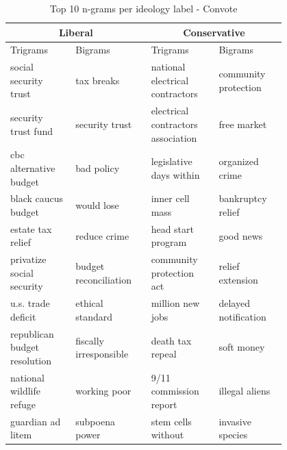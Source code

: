 \documentclass[10pt,a4paper,onecolumn]{article}
\begin{document}
\begin{table}[h!]
	\begin{center}
		\caption{Top 10 n-grams per ideology label - Convote}
		\label{tab:ngrams-convote}
		\begin{tabular}{p{0.2\linewidth}|p{0.2\linewidth}|p{0.2\linewidth}|p{0.2\linewidth}}
			\hline\hline
			\multicolumn{2}{c|}{\textbf{Liberal}} & \multicolumn{2}{c|}{\textbf{Conservative}} \\
			\hline
			Trigrams & Bigrams & Trigrams & Bigrams \\
			\hline
			social security trust & tax breaks & national electrical contractors & community protection \\
			security trust fund & security trust & electrical contractors association & free market \\
			cbc alternative budget & bad policy & legislative days within & organized crime \\
			black caucus budget & would lose & inner cell mass & bankruptcy relief \\
			estate tax relief & reduce crime & head start program & good news \\
			privatize social security & budget reconciliation & community protection act & relief extension \\
			u.s. trade deficit & ethical standard & million new jobs & delayed notification \\
			republican budget resolution & fiscally irresponsible & death tax repeal & soft money \\
			national wildlife refuge & working poor & 9/11 commission report & illegal aliens \\
			guardian ad litem & subpoena power & stem cells without & invasive species \\
			\hline\hline
		\end{tabular}
	\end{center}
\end{table}
\end{document}
